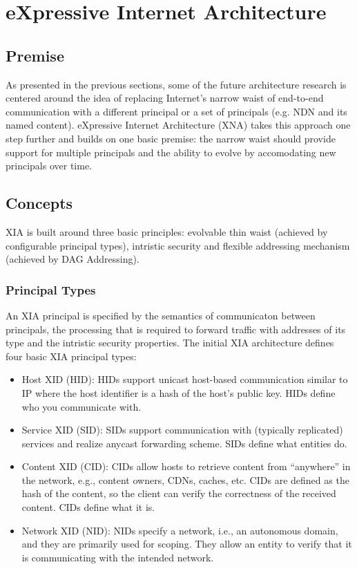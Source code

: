     \section{eXpressive Internet Architecture}\label{archs:xia}

        \subsection{Premise}

            As presented in the previous sections, some of the future architecture research is centered around the idea of replacing Internet's narrow waist of end-to-end communication with a different principal or a set of principals (e.g. NDN and its named content). eXpressive Internet Architecture (XNA) takes this approach one step further and builds on one basic premise: the narrow waist should provide support for multiple principals and the ability to evolve by accomodating new principals over time.

        \subsection{Concepts}

            XIA is built around three basic principles: evolvable thin waist (achieved by configurable principal types), intristic security and flexible addressing mechanism (achieved by DAG Addressing).

            \subsubsection{Principal Types}

                An XIA principal is specified by the semantics of communicaton between principals, the processing that is required to forward traffic with addresses of its type and the intristic security properties. The initial XIA architecture defines four basic XIA principal types:

                \begin{itemize}
                    \item Host XID (HID): HIDs support unicast host-based communication similar to IP where the host identifier is a hash of the host’s public key. HIDs define who you communicate with.
                    \item Service XID (SID): SIDs support communication with (typically replicated) services and realize anycast forwarding scheme. SIDs define what entities do.
                    \item Content XID (CID): CIDs allow hosts to retrieve content from ``anywhere'' in the network, e.g., content owners, CDNs, caches, etc. CIDs are defined as the hash of the content, so the client can verify the correctness of the received content. CIDs define what it is.
                    \item Network XID (NID): NIDs specify a network, i.e., an autonomous domain, and they are primarily used for scoping. They allow an entity to verify that it is communicating with the intended network.
                \end{itemize}

